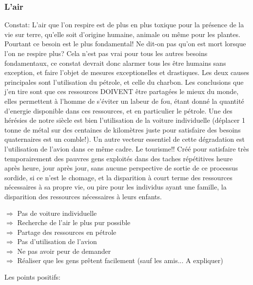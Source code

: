 \documentclass[11pt]{article} %
\begin{document}
\subsubsection{L'air}
Constat: L'air que l'on respire est de plus en plus toxique pour la présence de la vie sur terre, qu'elle soit d'origine humaine, animale ou même pour les plantes.
Pourtant ce besoin est le plus fondamental! Ne dit-on pas qu'on est mort lorsque l'on ne respire plus? Cela n'est pas vrai pour tous les autres besoins fondamentaux, ce constat devrait donc alarmer tous les être humains sans exception, et faire l'objet de mesures exceptionelles et drastiques.
Les deux causes principales sont l'utilisation du pétrole, et celle du charbon.
Les conclusions que j'en tire sont que ces ressources DOIVENT être partagées le mieux du monde, elles permettent à l'homme de s'éviter un labeur de fou, étant donné la quantité d'energie disponible dans ces ressources, et en particulier le pétrole.
Une des hérésies de notre siècle est bien l'utilisation de la voiture individuelle (déplacer 1 tonne de métal sur des centaines de kilomètres juste pour satisfaire des besoins quaternaires est un comble!).
Un autre vecteur essentiel de cette dégradation est l'utilisation de l'avion dans ce même cadre. Le tourisme!! Créé pour satisfaire très temporairement des pauvres gens exploités dans des taches répétitives heure après heure, jour après jour, sans aucune perspective de sortie de ce processus sordide, si ce n'est le chomage, et la disparition à court terme des ressources nécessaires à sa propre vie, ou pire pour les individus ayant une famille, la disparition des ressources nécessaires à leurs enfants.\\
\begin{flushleft}
$ \Rightarrow $ Pas de voiture individuelle\\
$ \Rightarrow $ Recherche de l'air le plus pur possible\\
$ \Rightarrow $ Partage des ressources en pétrole\\
$ \Rightarrow $ Pas d'utilisation de l'avion\\
$ \Rightarrow $ Ne pas avoir peur de demander\\
$ \Rightarrow $ Réaliser que les gens prêtent facilement (sauf les amis... A expliquer)\\
\end{flushleft}

Les points positifs:
\end{document}
